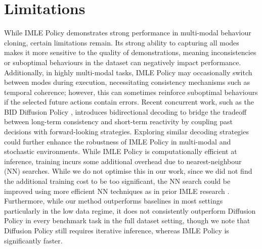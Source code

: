 
\section{Limitations}

While IMLE Policy demonstrates strong performance in multi-modal behaviour cloning, certain limitations remain. Its strong ability to capturing all modes makes it more sensitive to the quality of demonstrations, meaning inconsistencies or suboptimal behaviours in the dataset can negatively impact performance. Additionally, in highly multi-modal tasks, IMLE Policy may occasionally switch between modes during execution, necessitating consistency mechanisms such as temporal coherence; however, this can sometimes reinforce suboptimal behaviours if the selected future actions contain errors.
Recent concurrent work, such as the BID Diffusion Policy \cite{liu2024bidirectional}, introduces bidirectional decoding to bridge the tradeoff between long-term consistency and short-term reactivity by coupling past decisions with forward-looking strategies. Exploring similar decoding strategies could further enhance the robustness of IMLE Policy in multi-modal and stochastic environments. While IMLE Policy is computationally efficient at inference, training incurs some additional overhead due to nearest-neighbour (NN) searches. While we do not optimise this in our work, since we did not find the additional training cost to be too significant, the NN search could be improved using more efficient NN techniques as in prior IMLE research \cite{imle}. Furthermore, while our method outperforms baselines in most settings particularly in the low data regime, it does not consistently outperform Diffusion Policy in every benchmark task in the full dataset setting, though we note that Diffusion Policy still requires iterative inference, whereas IMLE Policy is significantly faster.





